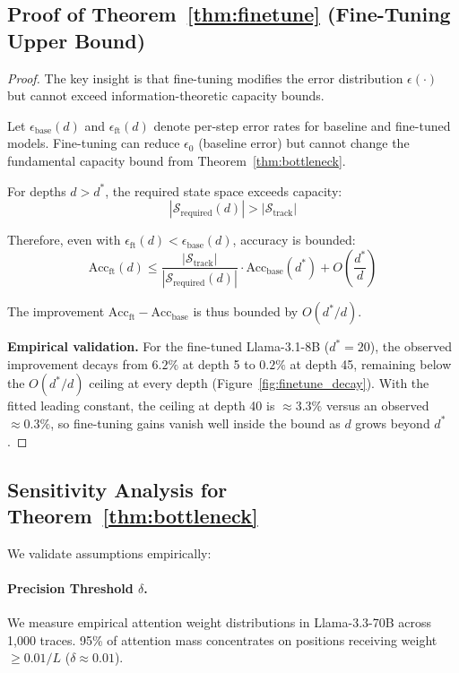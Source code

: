 \documentclass{article}
\theoremstyle{plain}
\theoremstyle{definition}
\theoremstyle{remark}
\begin{document}
\subsection{Proof of Theorem~\ref{thm:finetune} (Fine-Tuning Upper Bound)}

\begin{proof}
The key insight is that fine-tuning modifies the error distribution $\epsilon(\cdot)$ but cannot exceed information-theoretic capacity bounds.

Let $\epsilon_{\text{base}}(d)$ and $\epsilon_{\text{ft}}(d)$ denote per-step error rates for baseline and fine-tuned models. Fine-tuning can reduce $\epsilon_0$ (baseline error) but cannot change the fundamental capacity bound from Theorem~\ref{thm:bottleneck}.

For depths $d > d^*$, the required state space exceeds capacity:
\begin{equation}
|\mathcal{S}_{\text{required}}(d)| > |\mathcal{S}_{\text{track}}|
\end{equation}

Therefore, even with $\epsilon_{\text{ft}}(d) < \epsilon_{\text{base}}(d)$, accuracy is bounded:
\begin{equation}
\text{Acc}_{\text{ft}}(d) \leq \frac{|\mathcal{S}_{\text{track}}|}{|\mathcal{S}_{\text{required}}(d)|} \cdot \text{Acc}_{\text{base}}(d^*) + O\left(\frac{d^*}{d}\right)
\end{equation}

The improvement $\text{Acc}_{\text{ft}} - \text{Acc}_{\text{base}}$ is thus bounded by $O(d^*/d)$.

\textbf{Empirical validation.} For the fine-tuned Llama-3.1-8B ($d^* = 20$), the observed improvement decays from $6.2\%$ at depth 5 to $0.2\%$ at depth 45, remaining below the $O(d^*/d)$ ceiling at every depth (Figure~\ref{fig:finetune_decay}). With the fitted leading constant, the ceiling at depth 40 is $\approx 3.3\%$ versus an observed $\approx 0.3\%$, so fine-tuning gains vanish well inside the bound as $d$ grows beyond $d^*$.
\end{proof}

\subsection{Sensitivity Analysis for Theorem~\ref{thm:bottleneck}}
\label{app:sensitivity}

We validate assumptions empirically:

\paragraph{Precision Threshold $\delta$.} We measure empirical attention weight distributions in Llama-3.3-70B across 1,000 traces. 95\% of attention mass concentrates on positions receiving weight $\geq 0.01/L$ ($\delta \approx 0.01$).
\end{document}
